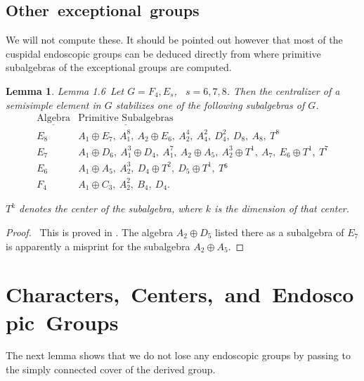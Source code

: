 \documentclass{memo-l}
\newtheorem{lemma}[theorem]{Lemma}
\theoremstyle{definition}
\theoremstyle{remark}
\numberwithin{section}{chapter}
\numberwithin{equation}{chapter}
\begin{document}
\subsection{Other\  exceptional\  groups}

   We will not compute these.  It should be pointed out however that most
of the cuspidal endoscopic groups can be deduced directly from \cite{MR0338284} where
primitive subalgebras of the exceptional groups are computed.
 
\setcounter{theorem}{5} %

\begin{lemma}{Lemma 1.6}\ Let $G  =  F_{4}, E_{s}$, \ $s = 6,7,8$.  Then the
centralizer of a semisimple element in $G$ stabilizes one of the following
subalgebras of $G$.
$$
\begin{matrix} 
{\underline{{\text{Algebra}}}} & {\underline{{\text{Primitive\ Subalgebras}}}} \\
E_{8} &  A_{1}\oplus E_{7},\ A_{1}^{8},\ A_{2}\oplus E_{6},\ A_{2}^{4},\ A_{4}^{2},\
D_{4}^{2},\ D_{8},\ A_{8},\ T^{8} \\
E_{7} & A_{1}\oplus D_{6},\ A_{1}^{3}\oplus D_{4},\ A_{1}^{7},\ A_{2}\oplus A_{5},\
A_{2}^{3}\oplus T^{1},\ A_{7},\ E_{6}\oplus T^{1},\ T^{7} \\
E_{6} & A_{1}\oplus A_{5},\ A_{2}^{3},\ D_{4}\oplus T^{2},\ D_{5}\oplus T^{1},\ 
T{}^{6} \\
F_{4} & A_{1}\oplus C_{3},\ A_{2}^{2},\ B_{4},\ D_{4} .
\end{matrix}
$$

\noindent
$T^{k}$ denotes the center of the subalgebra, where $k$ is the dimension of
that center.
\end{lemma}


\begin{proof} \ This is proved in \cite{MR0338284}.  The algebra $A_{2}\oplus D_{5}$
listed there as a subalgebra of $E_{7}$ is apparently a misprint for the
subalgebra $A_{2}\oplus  A_{5}$.
\end{proof} 



\section{Characters,\ Centers,\ and\ Endoscopic\ Groups}

   The next lemma shows that we do not lose any endoscopic groups by
passing to the simply connected cover of the derived group.
\end{document}
